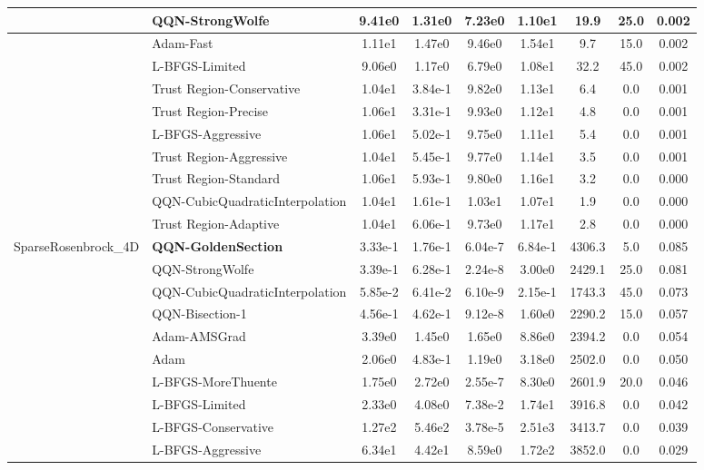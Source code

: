 \documentclass[10pt]{article}
\begin{document}
\begin{longtable}{|l|l|c|c|c|c|c|c|c|}
\hline
 & QQN-StrongWolfe & 9.41e0 & 1.31e0 & 7.23e0 & 1.10e1 & 19.9 & 25.0 & 0.002 \\
\hline
 & Adam-Fast & 1.11e1 & 1.47e0 & 9.46e0 & 1.54e1 & 9.7 & 15.0 & 0.002 \\
\hline
 & L-BFGS-Limited & 9.06e0 & 1.17e0 & 6.79e0 & 1.08e1 & 32.2 & 45.0 & 0.002 \\
\hline
 & Trust Region-Conservative & 1.04e1 & 3.84e-1 & 9.82e0 & 1.13e1 & 6.4 & 0.0 & 0.001 \\
\hline
 & Trust Region-Precise & 1.06e1 & 3.31e-1 & 9.93e0 & 1.12e1 & 4.8 & 0.0 & 0.001 \\
\hline
 & L-BFGS-Aggressive & 1.06e1 & 5.02e-1 & 9.75e0 & 1.11e1 & 5.4 & 0.0 & 0.001 \\
\hline
 & Trust Region-Aggressive & 1.04e1 & 5.45e-1 & 9.77e0 & 1.14e1 & 3.5 & 0.0 & 0.001 \\
\hline
 & Trust Region-Standard & 1.06e1 & 5.93e-1 & 9.80e0 & 1.16e1 & 3.2 & 0.0 & 0.000 \\
\hline
 & QQN-CubicQuadraticInterpolation & 1.04e1 & 1.61e-1 & 1.03e1 & 1.07e1 & 1.9 & 0.0 & 0.000 \\
\hline
 & Trust Region-Adaptive & 1.04e1 & 6.06e-1 & 9.73e0 & 1.17e1 & 2.8 & 0.0 & 0.000 \\
SparseRosenbrock\_4D & \textbf{QQN-GoldenSection} & 3.33e-1 & 1.76e-1 & 6.04e-7 & 6.84e-1 & 4306.3 & 5.0 & 0.085 \\
\hline
 & QQN-StrongWolfe & 3.39e-1 & 6.28e-1 & 2.24e-8 & 3.00e0 & 2429.1 & 25.0 & 0.081 \\
\hline
 & QQN-CubicQuadraticInterpolation & 5.85e-2 & 6.41e-2 & 6.10e-9 & 2.15e-1 & 1743.3 & 45.0 & 0.073 \\
\hline
 & QQN-Bisection-1 & 4.56e-1 & 4.62e-1 & 9.12e-8 & 1.60e0 & 2290.2 & 15.0 & 0.057 \\
\hline
 & Adam-AMSGrad & 3.39e0 & 1.45e0 & 1.65e0 & 8.86e0 & 2394.2 & 0.0 & 0.054 \\
\hline
 & Adam & 2.06e0 & 4.83e-1 & 1.19e0 & 3.18e0 & 2502.0 & 0.0 & 0.050 \\
\hline
 & L-BFGS-MoreThuente & 1.75e0 & 2.72e0 & 2.55e-7 & 8.30e0 & 2601.9 & 20.0 & 0.046 \\
\hline
 & L-BFGS-Limited & 2.33e0 & 4.08e0 & 7.38e-2 & 1.74e1 & 3916.8 & 0.0 & 0.042 \\
\hline
 & L-BFGS-Conservative & 1.27e2 & 5.46e2 & 3.78e-5 & 2.51e3 & 3413.7 & 0.0 & 0.039 \\
\hline
 & L-BFGS-Aggressive & 6.34e1 & 4.42e1 & 8.59e0 & 1.72e2 & 3852.0 & 0.0 & 0.029 \\

\end{longtable}
\end{document}
